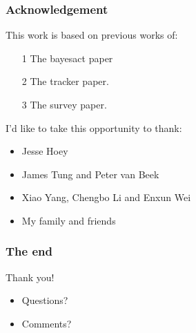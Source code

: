 \documentclass{beamer}
\begin{document}
\begin{frame}
\frametitle{Acknowledgement}
This work is based on previous works of:
\begin{itemize}
\item [1] The bayesact paper
\item [2] The tracker paper.
\item [3] The survey paper.
\end{itemize}
\vspace{0.3cm}
I'd like to take this opportunity to thank:
\begin{itemize}
\item Jesse Hoey
\item James Tung and Peter van Beek
\item Xiao Yang, Chengbo Li and Enxun Wei
\item My family and friends
\end{itemize}
\end{frame}
\begin{frame}
\frametitle{The end}
\Huge{\centerline{Thank you!}}   
\fontsize{5mm}{4mm}
\begin{itemize}
\item Questions?
\item Comments?
\end{itemize}
\end{frame}

\end{document}
